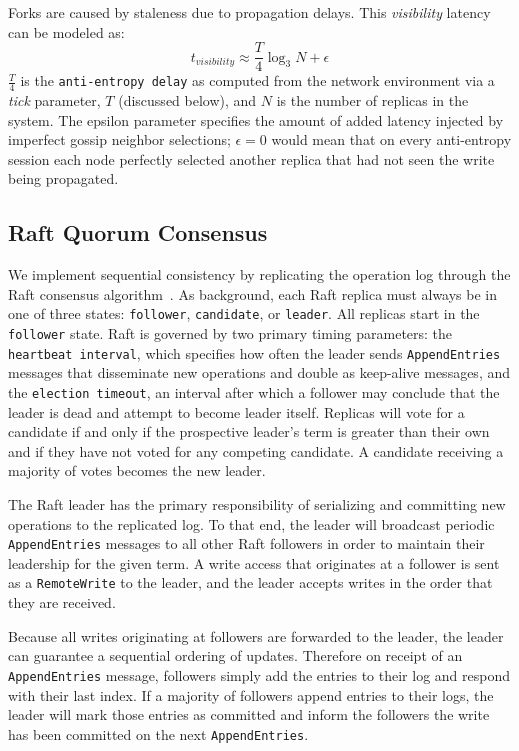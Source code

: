 \documentclass[10pt,conference,letterpaper]{IEEEtran}
\begin{document}
Forks are caused by staleness due to propagation delays.
This \emph{visibility} latency can be modeled as:
\begin{equation}
t_{visibility} \approx \frac{T}{4} \log_3N + \epsilon
\label{eq:propagation}
\end{equation}
$\frac{T}{4}$ is the
\texttt{anti-entropy delay} as computed from the network environment via a \emph{tick}
parameter, $T$ (discussed below), and $N$ is the number of replicas in the system.
The epsilon parameter specifies the amount of added latency injected by imperfect gossip
neighbor selections; $\epsilon = 0$ would mean that on every anti-entropy session
each node perfectly selected another replica that had not seen the write being propagated.

\subsection{Raft Quorum Consensus}

We implement sequential consistency by replicating the operation log through the Raft
consensus algorithm~\cite{ongaro_search_2014}.
As background, each Raft replica must always be in one of three states: \texttt{follower},
\texttt{candidate}, or \texttt{leader}.
All replicas start in the \texttt{follower} state.
Raft is governed by two primary timing parameters: the \texttt{heartbeat interval}, which
specifies how often the leader sends \texttt{AppendEntries} messages that disseminate new
operations and double as
keep-alive messages, and the \texttt{election timeout}, an interval after which a follower
may conclude that the leader is dead and attempt to become leader itself.
Replicas will vote for a candidate if and only if the prospective leader's term is greater
than their own and if they have not voted for any competing candidate.
A candidate receiving a majority of votes becomes the new leader.

The Raft leader has the primary responsibility of serializing and committing new
operations to the replicated log.
To that end, the leader will broadcast periodic \texttt{AppendEntries} messages to all
other Raft followers in order to maintain their leadership for the given term.
A write access that originates at a follower is sent as a \texttt{RemoteWrite} to the
leader, and the leader accepts writes in the order that they are received.

Because all writes originating at followers are forwarded to the leader, the leader can
guarantee a sequential ordering of updates.
Therefore on receipt of an \texttt{AppendEntries} message, followers simply add the
entries to their log and respond with their last index.
If a majority of followers append entries to their logs, the leader will mark those
entries as committed and inform the followers the write has been committed on the next
\texttt{AppendEntries}.
\end{document}
